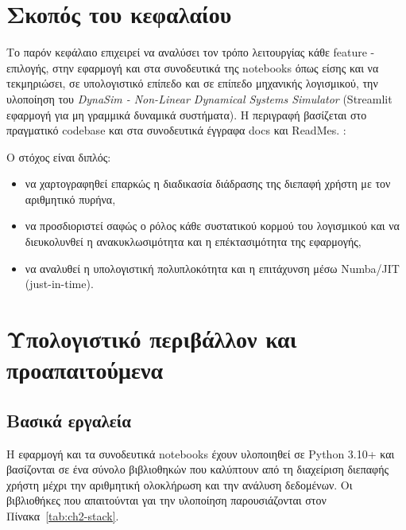 \documentclass[11pt,a4paper]{report}
\begin{document}
\section{Σκοπός του κεφαλαίου}

Το παρόν κεφάλαιο επιχειρεί να αναλύσει τον τρόπο λειτουργίας
κάθε feature - επιλογής, στην εφαρμογή και στα συνοδευτικά της notebooks
όπως είσης και να τεκμηριώσει, σε υπολογιστικό επίπεδο και σε επίπεδο μηχανικής
λογισμικού, την υλοποίηση του \textit{DynaSim - Non-Linear Dynamical Systems Simulator} (Streamlit εφαρμογή για
μη γραμμικά δυναμικά συστήματα). Η περιγραφή βασίζεται στο πραγματικό
codebase και στα συνοδευτικά έγγραφα docs και ReadMes. \cite{nlds_internal_md_docs}:

Ο στόχος είναι διπλός:
\begin{itemize}
\item να χαρτογραφηθεί επαρκώς η διαδικασία διάδρασης της διεπαφή χρήστη με τον αριθμητικό πυρήνα,
\item να προσδιοριστεί σαφώς ο ρόλος κάθε συστατικού κορμού του λογισμικού και να διευκολυνθεί η ανακυκλωσιμότητα και η επέκτασιμότητα της εφαρμογής,
\item να αναλυθεί η υπολογιστική πολυπλοκότητα και η επιτάχυνση μέσω Numba/JIT (just-in-time).
\end{itemize}

\section{Υπολογιστικό περιβάλλον και προαπαιτούμενα}

\subsection{Βασικά εργαλεία}

Η εφαρμογή και τα συνοδευτικά notebooks έχουν υλοποιηθεί σε Python 3.10+ και βασίζονται σε ένα σύνολο βιβλιοθηκών που καλύπτουν από τη διαχείριση διεπαφής χρήστη μέχρι την αριθμητική ολοκλήρωση και την ανάλυση δεδομένων. 
Οι βιβλιοθήκες που απαιτούνται γαι την υλοποίηση παρουσιάζονται στον Πίνακα~\ref{tab:ch2-stack}.
\end{document}
